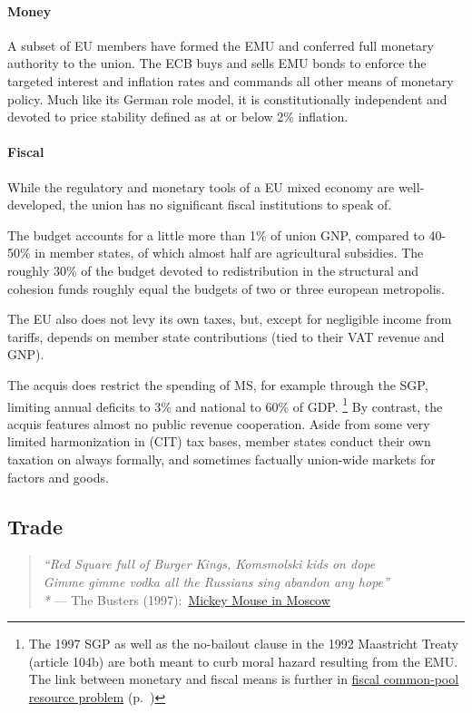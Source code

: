 \paragraph{Money} A subset of \gls{EU} members have formed the \gls{EMU} and conferred full monetary authority to the union.
The \gls{ECB} buys and sells \gls{EMU} bonds to enforce the targeted interest and inflation rates and commands all other means of monetary policy.
Much like its German role model, it is constitutionally independent and devoted to price stability defined as at or below 2\% inflation.

\paragraph{Fiscal} While the regulatory and monetary tools of a \gls{EU} mixed economy are well-developed, the union has no significant fiscal institutions to speak of.


The budget accounts for a little more than 1\% of union \gls{GNP}, compared to 40-50\% in member states, of which almost half are agricultural subsidies.
The roughly 30\% of the budget devoted to redistribution in the structural and cohesion funds roughly equal the budgets of two or three european metropolis.

The \gls{EU} also does not levy its own taxes, but, except for negligible income from tariffs, depends on member state contributions (tied to their \gls{VAT} revenue and \gls{GNP}).

The acquis does restrict the spending of \gls{MS}, for example through the \gls{SGP}, limiting annual deficits to 3\% and national to 60\% of \gls{GDP}.
\footnote{
	The 1997 \gls{SGP} as well as the no-bailout clause in the 1992 Maastricht Treaty (article 104b) are both meant to curb moral hazard resulting from the \gls{EMU}.
	The link between monetary and fiscal means is further in \hyperref[sec:fiscal-CPR]{fiscal common-pool resource problem} (p.~\pageref{sec:fiscal-CPR})
}
By contrast, the acquis features almost no public revenue cooperation.
Aside from some very limited harmonization in (\gls{CIT}) tax bases, member states conduct their own taxation on always formally, and sometimes factually union-wide markets for factors and goods.

\subsection[Trade]{Trade}
\begin{verse}
	\emph{``Red Square full of Burger Kings, Komsmolski kids on dope \\
	Gimme gimme vodka all the Russians sing abandon any hope''\\*}
	--- The Busters (1997):\ \href{http://www.youtube.com/watch?v=xsxRMOnpMTY}{Mickey Mouse in Moscow}\\
\end{verse}

